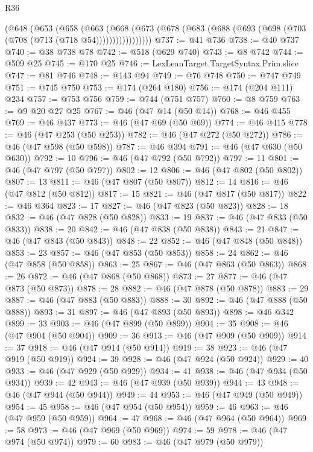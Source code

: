 \begin{lexlean}{R36}
\begin{coremodule}
        (@648
          (@653
            (@658
              (@663
                (@668
                  (@673 (@678 (@683 (@688 (@693 (@698 (@703 (@708 (@713 (@718 @54)))))))))))))))))
@737 := @41 @736
@738 := @40 @737
@740 := @38 @738 @78
@742 := @518 (@629 @740)
@743 := @8 @742
@744 := @509 @25
@745 := @170 @25
@746 := LexLeanTarget.TargetSyntax.Prim.slice
@747 := @81 @746
@748 := @143 @94
@749 := @76 @748
@750 := @747 @749
@751 := @745 @750
@753 := @174 (@264 @180)
@756 := @174 (@204 @111) @234
@757 := @753 @756
@759 := @744 (@751 @757)
@760 := @8 @759
@763 := @9 @20 @27 @25
@767 := @46 (@47 @14 (@50 @14))
@768 := @46 @455
@769 := @46 @437
@773 := @46 (@47 @69 (@50 @69))
@774 := @46 @415
@778 := @46 (@47 @253 (@50 @253))
@782 := @46 (@47 @272 (@50 @272))
@786 := @46 (@47 @598 (@50 @598))
@787 := @46 @394
@791 := @46 (@47 @630 (@50 @630))
@792 := 10
@796 := @46 (@47 @792 (@50 @792))
@797 := 11
@801 := @46 (@47 @797 (@50 @797))
@802 := 12
@806 := @46 (@47 @802 (@50 @802))
@807 := 13
@811 := @46 (@47 @807 (@50 @807))
@812 := 14
@816 := @46 (@47 @812 (@50 @812))
@817 := 15
@821 := @46 (@47 @817 (@50 @817))
@822 := @46 @364
@823 := 17
@827 := @46 (@47 @823 (@50 @823))
@828 := 18
@832 := @46 (@47 @828 (@50 @828))
@833 := 19
@837 := @46 (@47 @833 (@50 @833))
@838 := 20
@842 := @46 (@47 @838 (@50 @838))
@843 := 21
@847 := @46 (@47 @843 (@50 @843))
@848 := 22
@852 := @46 (@47 @848 (@50 @848))
@853 := 23
@857 := @46 (@47 @853 (@50 @853))
@858 := 24
@862 := @46 (@47 @858 (@50 @858))
@863 := 25
@867 := @46 (@47 @863 (@50 @863))
@868 := 26
@872 := @46 (@47 @868 (@50 @868))
@873 := 27
@877 := @46 (@47 @873 (@50 @873))
@878 := 28
@882 := @46 (@47 @878 (@50 @878))
@883 := 29
@887 := @46 (@47 @883 (@50 @883))
@888 := 30
@892 := @46 (@47 @888 (@50 @888))
@893 := 31
@897 := @46 (@47 @893 (@50 @893))
@898 := @46 @342
@899 := 33
@903 := @46 (@47 @899 (@50 @899))
@904 := 35
@908 := @46 (@47 @904 (@50 @904))
@909 := 36
@913 := @46 (@47 @909 (@50 @909))
@914 := 37
@918 := @46 (@47 @914 (@50 @914))
@919 := 38
@923 := @46 (@47 @919 (@50 @919))
@924 := 39
@928 := @46 (@47 @924 (@50 @924))
@929 := 40
@933 := @46 (@47 @929 (@50 @929))
@934 := 41
@938 := @46 (@47 @934 (@50 @934))
@939 := 42
@943 := @46 (@47 @939 (@50 @939))
@944 := 43
@948 := @46 (@47 @944 (@50 @944))
@949 := 44
@953 := @46 (@47 @949 (@50 @949))
@954 := 45
@958 := @46 (@47 @954 (@50 @954))
@959 := 46
@963 := @46 (@47 @959 (@50 @959))
@964 := 47
@968 := @46 (@47 @964 (@50 @964))
@969 := 58
@973 := @46 (@47 @969 (@50 @969))
@974 := 59
@978 := @46 (@47 @974 (@50 @974))
@979 := 60
@983 := @46 (@47 @979 (@50 @979))

\end{coremodule}
\end{lexlean}
